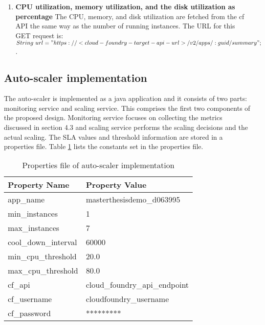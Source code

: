 \documentclass[article,type=msc,colorback,12pt,accentcolor=tud8b,table]{tudthesis}
\begin{document}
\begin{enumerate}
	\item\textbf{{CPU utilization, memory utilization, and the disk utilization as percentage}} 
	 The CPU, memory, and disk utilization are fetched from the \gls{cf} API the same way as the number of running instances. The URL for this GET request is:  \newline
	$ String\ url = "https://<cloud-foundry-target-api-url>/v2/apps/:guid/summary"; $. 
	
\end{enumerate}	
	
	\subsection{Auto-scaler implementation} 
	
	The auto-scaler is implemented as a java application and it consists of two parts: monitoring service and scaling service. This comprises the first two components of the proposed design. Monitoring service focuses on collecting the metrics discussed in section 4.3 and scaling service performs the scaling decisions and the actual scaling. The SLA values and threshold information are stored in a properties file. Table \ref{tab:as_properties} lists the constants set in the properties file. 
	
	\begin{table}[H]
		\centering
		\caption{Properties file of auto-scaler implementation}
		\label{tab:as_properties}
		\begin{tabular}{|l|l|}
			\hline
			\rowcolor[HTML]{EC6500} 
			Property Name        & Property Value                \\ \hline
			app\_name            & masterthesisdemo\_d063995     \\ \hline
			min\_instances       & 1                             \\ \hline
			max\_instances       & 7                             \\ \hline
			cool\_down\_interval & 60000                         \\ \hline
			min\_cpu\_threshold  & 20.0                          \\ \hline
			max\_cpu\_threshold  & 80.0                          \\ \hline
			cf\_api              & cloud\_foundry\_api\_endpoint \\ \hline
			cf\_username         & cloudfoundry\_username           \\ \hline
			cf\_password         & *********                     \\ \hline
		\end{tabular}
	\end{table}
	
\end{document}
